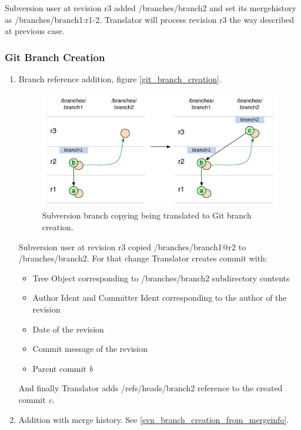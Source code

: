 \begin{enumerate}
Subversion user at revision r3 added /branches/branch2 and set its mergehistory as /branches/branch1:r1-2. Translator will process revision r3 the way described at previous case.
\end{enumerate}

\subsubsection{Git Branch Creation}

\begin{enumerate}
\compactlist
\item Branch reference addition, figure \ref{git_branch_creation}.

\begin{figure}[!h]
\label{svn_branch_creation}
\centering
\includegraphics[width=\linewidth]{img/diagrams/branch_creation_svn_to_git.pdf}
\caption{Subversion branch copying being translated to Git branch creation.}
\end{figure}

Subversion user at revision r3 copied /branches/branch1@r2 to /branches/branch2. For that change Translator creates commit with:
\begin{itemize}
	\item Tree Object corresponding to /branches/branch2 subdirectory contents
	\item Author Ident and Committer Ident corresponding to the author of the revision
	\item Date of the revision
	\item Commit message of the revision
	\item Parent commit \emph{b}
\end{itemize}
And finally Translator adds /refs/heads/branch2 reference to the created commit \emph{c}.

\item Addition with merge history. See \ref{svn_branch_creation_from_mergeinfo}.


\end{enumerate}
